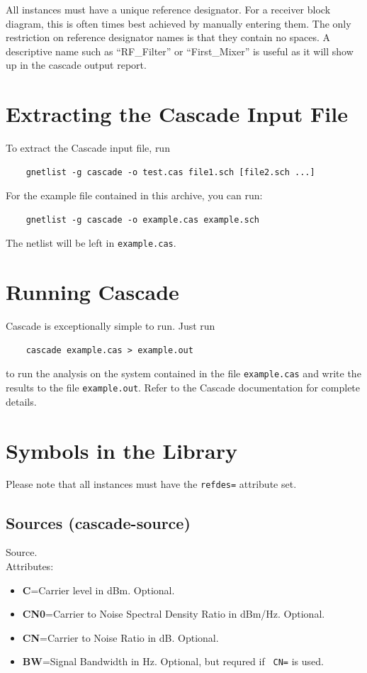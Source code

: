 \documentclass{article}
\begin{document}
All instances must have a unique reference designator.  For a receiver
block diagram, this is often times best achieved by manually entering
them.  The only restriction on reference designator names is that they
contain no spaces.  A descriptive name such as ``RF\_Filter'' or
``First\_Mixer'' is useful as it will show up in the cascade output
report. 

\section{Extracting the Cascade Input File}
To extract the Cascade input file, run
\begin{verbatim}
    gnetlist -g cascade -o test.cas file1.sch [file2.sch ...]
\end{verbatim}
For the example file contained in this archive, you can run: 
\begin{verbatim}
    gnetlist -g cascade -o example.cas example.sch
\end{verbatim}

The netlist will be left in {\tt example.cas}.

\section{Running Cascade}
Cascade is exceptionally simple to run.  Just run
\begin{verbatim}
    cascade example.cas > example.out
\end{verbatim}
to run the analysis on the system contained in the file
{\tt example.cas} and write the results to the file
{\tt example.out}.  Refer to the Cascade documentation 
for complete details.

\appendix
\section{Symbols in the Library}
Please note that all instances must have  the
{\tt refdes=} attribute set.

\subsection{Sources (cascade-source)}
Source. \\
Attributes:
\begin{itemize}
\item {\bf C}=Carrier level in dBm.  Optional.
\item {\bf CN0}=Carrier to Noise Spectral Density Ratio in dBm/Hz.  Optional.
\item {\bf CN}=Carrier to Noise Ratio in dB.  Optional.
\item {\bf BW}=Signal Bandwidth in Hz.  Optional, but requred if {\tt
    CN=} is used.
\end{itemize}
\end{document}
